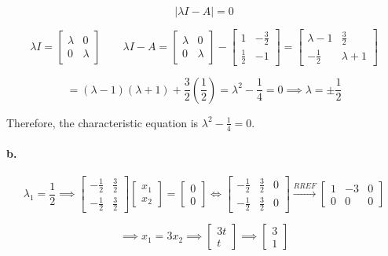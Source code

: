 \documentclass{report}
\begin{document}
$$
| \lambda I - A |  = 0 
$$

$$
\lambda I = \begin{bmatrix} \lambda & 0 \\ 0 & \lambda \end{bmatrix} \quad \quad \lambda I - A  = \begin{bmatrix} \lambda & 0 \\ 0 & \lambda \end{bmatrix} - \begin{bmatrix} 1 & -\frac{3}{2} \\ \frac{1}{2} & -1 \end{bmatrix} = \begin{bmatrix} \lambda - 1 & \frac{3}{2} \\ -\frac{1}{2} & \lambda + 1 \end{bmatrix} 
$$

$$
= (\lambda - 1)(\lambda + 1) + \frac{3}{2} \left( \frac{1}{2} \right) = \lambda^2 - \frac{1}{4} = 0 \implies \lambda = \pm \frac{1}{2}
$$

\noindent Therefore, the characteristic equation is $\lambda^2 - \frac{1}{4} = 0$. 

\paragraph{b.} 

$$
\lambda_1 = \frac{1}{2} \implies \begin{bmatrix} -\frac{1}{2} & \frac{3}{2} \\ -\frac{1}{2} & \frac{3}{2} \end{bmatrix} \begin{bmatrix} x_1 \\ x_2 \end{bmatrix} = \begin{bmatrix} 0 \\ 0 \end{bmatrix} \iff \begin{bmatrix} -\frac{1}{2} & \frac{3}{2} & 0 \\ -\frac{1}{2} & \frac{3}{2} & 0 \end{bmatrix} \xrightarrow{RREF} \begin{bmatrix} 1 & -3 & 0 \\ 0 & 0 & 0 \end{bmatrix} 
$$

$$
\implies x_1 = 3x_2 \implies \begin{bmatrix} 3t \\ t \end{bmatrix} \implies \begin{bmatrix} 3 \\ 1 \end{bmatrix} 
$$
\end{document}
